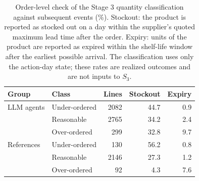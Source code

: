 \begin{table}[t]
\centering
\small
\begin{tabular}{llrrr}
\toprule
Group & Class & Lines & Stockout & Expiry \\
\midrule
LLM agents & Under-ordered & 2082 & 44.7 & 0.9 \\
 & Reasonable & 2765 & 34.2 & 2.4 \\
 & Over-ordered & 299 & 32.8 & 9.7 \\
\midrule
References & Under-ordered & 130 & 56.2 & 0.8 \\
 & Reasonable & 2146 & 27.3 & 1.2 \\
 & Over-ordered & 92 & 4.3 & 7.6 \\
\bottomrule
\end{tabular}
\caption{Order-level check of the Stage 3 quantity classification against subsequent events (\%). Stockout: the product is reported as stocked out on a day within the supplier's quoted maximum lead time after the order. Expiry: units of the product are reported as expired within the shelf-life window after the earliest possible arrival. The classification uses only the action-day state; these rates are realized outcomes and are not inputs to $S_3$.}
\label{tab:order_quantity_validation}
\end{table}
